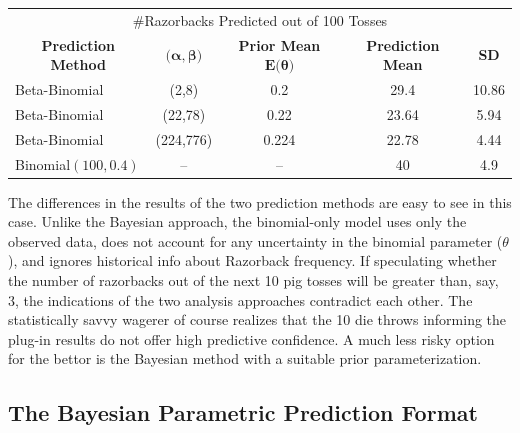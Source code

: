\documentclass[12pt, a4paper]{article}
\begin{document}
\vspace{2cm}


\vspace{1cm}

\begin{center}
  \begin{tabular}{l c c c c }
  \toprule
  \multicolumn{5}{c}{\large \#Razorbacks Predicted out of 100 Tosses}          \\
  \multicolumn{1}{c}{\textbf{Prediction Method}} & \multicolumn{1}{c}{$\textbf{(}\boldsymbol\alpha,\boldsymbol\beta\textbf{)}$}  & \multicolumn{1}{c}{\textbf{Prior Mean }$\textbf{E(}\boldsymbol\theta\textbf{)}$}  & \multicolumn{1}{c}{\textbf{Prediction Mean}} & \multicolumn{1}{c}{\textbf{SD}}\\
        \midrule
        Beta-Binomial & (2,8) & 0.2 & 29.4 & 10.86 \\
        \midrule
        Beta-Binomial & (22,78) & 0.22 & 23.64 & 5.94\\
        \midrule
        Beta-Binomial & (224,776) & 0.224 & 22.78 & 4.44 \\
        \midrule
        Binomial$(100,0.4)$ & -- & -- & 40 & 4.9 \\
  \bottomrule
  \end{tabular}
\end{center}


\noindent The differences in the results of the two prediction methods are easy to see in this case. Unlike the Bayesian approach, the binomial-only model uses only the observed data, does not account for any uncertainty in the binomial parameter ($\theta$), and ignores historical info about Razorback frequency.  If speculating whether the number of razorbacks out of the next 10 pig tosses will be greater than, say, 3, the indications of the two analysis approaches contradict each other.  The statistically savvy wagerer of course realizes that the 10 die throws informing the plug-in results do not offer high predictive confidence.  A much less risky option for the bettor is the Bayesian method with a suitable prior parameterization.


\clearpage

  \subsection{The Bayesian Parametric Prediction Format}
\end{document}

